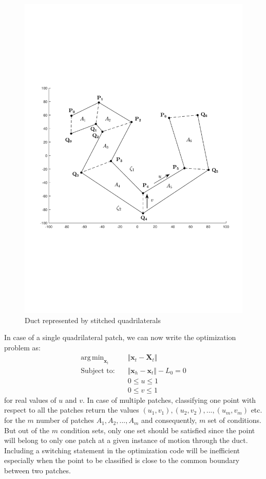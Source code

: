 \documentclass[12pt,a4]{article}
\DeclareMathOperator*{\argmin}{arg\,min}
\begin{document}
\begin{figure}[h]
\centering
\includegraphics[scale=0.5]{figures/fig7.pdf}
\caption{Duct represented by stitched quadrilaterals\label{fig:stitchequads}}
\end{figure}

 In case of a single quadrilateral patch, we can now write the optimization problem as:
 \begin{align} \label{eq:minx,u,v}
\argmin_{\textbf{x}_t} &\Vert \textbf{x}_t-\textbf{X}_t \Vert\\
\text{Subject to:~~~} &\Vert \textbf{x}_h - \textbf{x}_t \Vert -L_0 = 0 \nonumber \\
\text{~~~~~~~}& 0 \leq u \leq 1 \nonumber \\
\text{~~~~~~~} & 0 \leq v \leq 1 \nonumber
\end{align}
for real values of ${u}$ and ${v}$. In case of multiple patches, classifying one point with respect to all the patches return the values $\left({u}_1,{v}_1 \right), \left({u}_2,{v}_2 \right),...,\left({u}_m,{v}_m \right)$ etc. for the $m$ number of patches $A_1, A_2,..., A_m$ and consequently, $m$ set of conditions. But out of the $m$ condition sets, only one set should be satisfied since the point will belong to only one patch at a given instance of motion through the duct. Including a switching  statement in the optimization code will be inefficient especially when the point to be classified is close to the common boundary between two patches. 
\end{document}
